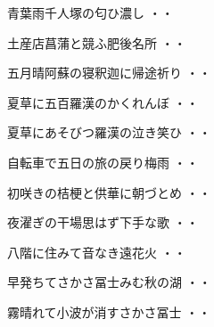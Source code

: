 \begin{shiika}青葉雨千人塚の匂ひ濃し
\hfill{・・}\end{shiika}
\vspace{0.6cm}
\begin{shiika}土産店菖蒲と競ふ肥後名所
\hfill{・・}\end{shiika}
\vspace{0.6cm}
\begin{shiika}五月晴阿蘇の寝釈迦に帰途祈り
\hfill{・・}\end{shiika}
\vspace{0.6cm}
\begin{shiika}夏草に五百羅漢のかくれんぼ
\hfill{・・}\end{shiika}
\vspace{0.6cm}
\begin{shiika}夏草にあそびつ羅漢の泣き笑ひ
\hfill{・・}\end{shiika}
\vspace{0.6cm}
\begin{shiika}自転車で五日の旅の戻り梅雨
\hfill{・・}\end{shiika}
\vspace{0.6cm}
\begin{shiika}初咲きの桔梗と供華に朝づとめ
\hfill{・・}\end{shiika}
\vspace{0.6cm}
\begin{shiika}夜濯ぎの干場思はず下手な歌
\hfill{・・}\end{shiika}
\vspace{0.6cm}
\begin{shiika}八階に住みて音なき遠花火
\hfill{・・}\end{shiika}
\vspace{0.6cm}
\begin{shiika}早発ちてさかさ冨士みむ秋の湖
\hfill{・・}\end{shiika}
\vspace{0.6cm}
\begin{shiika}霧晴れて小波が消すさかさ冨士
\hfill{・・}\end{shiika}
\vspace{0.6cm}

